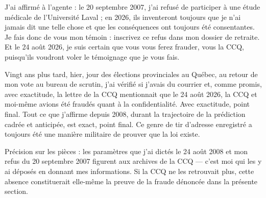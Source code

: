 \documentclass[12pt,letterpaper,oneside]{article}
\begin{document}
J'ai affirmé à l'agente : le 20 septembre 2007, j'ai refusé de participer à
une étude médicale de l'Université Laval ; en 2026, ils inventeront toujours
que je n'ai jamais dit une telle chose et que les conséquences ont toujours
été consentantes. Je fais donc de vous mon témoin : inscrivez ce refus dans
mon dossier de retraite. Et le 24 août 2026, je suis certain que vous vous
ferez frauder, vous la CCQ, puisqu'ils voudront voler le témoignage que je
vous fais.

Vingt ans plus tard, hier, jour des élections provinciales au Québec, au
retour de mon vote au bureau de scrutin, j'ai vérifié si j'avais du courrier
et, comme promis, avec exactitude, la lettre de la CCQ mentionnait que le
24 août 2026, la CCQ et moi-même avions été fraudés quant à la
confidentialité. Avec exactitude, point final. Tout ce que j'affirme depuis
2008, durant la trajectoire de la prédiction cadrée et anticipée, est exact,
point final. Ce genre de tir d'adresse enregistré a toujours été une manière
militaire de prouver que la loi existe.

Précision sur les pièces : les paramètres que j'ai dictés le 24 août 2008 et
mon refus du 20 septembre 2007 figurent aux archives de la CCQ — c'est moi
qui les y ai déposés en donnant mes informations. Si la CCQ ne les retrouvait
plus, cette absence constituerait elle-même la preuve de la fraude
dénoncée dans la présente section.
\end{document}
